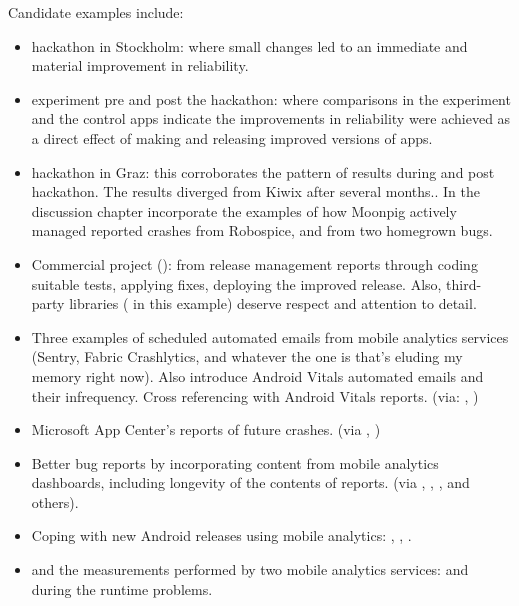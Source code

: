Candidate examples include:
\begin{itemize}
    \item {} hackathon in Stockholm: where small changes led to an immediate and material improvement in reliability. 
    \item {} experiment pre and post the hackathon: where comparisons in the experiment and the control apps indicate the improvements in reliability were achieved as a direct effect of making and releasing improved versions of apps.
    \item {} hackathon in Graz: this corroborates the pattern of results during and post hackathon. The results diverged from Kiwix after several months.. In the discussion chapter incorporate the examples of how Moonpig actively managed reported crashes from Robospice, and from two homegrown bugs.
    \item Commercial project (): from release management reports through coding suitable tests, applying fixes, deploying the improved release. Also, third-party libraries ( in this example) deserve respect and attention to detail.
    \item Three examples of scheduled automated emails from mobile analytics services (Sentry, Fabric Crashlytics, and whatever the one is that's eluding my memory right now). Also introduce Android Vitals automated emails and their infrequency. Cross referencing with Android Vitals reports. (via: , )
    \item Microsoft App Center's reports of future crashes. (via , )
    \item Better bug reports by incorporating content from mobile analytics dashboards, including longevity of the contents of reports. (via , , , and others).
    \item Coping with new Android releases using mobile analytics: , , .
    \item {}  and the measurements performed by two mobile analytics services:  and  during the runtime problems.
\end{itemize}


